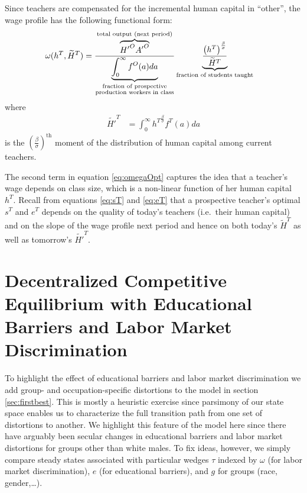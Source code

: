 \documentclass[onehalfspacing,11pt]{article}
\begin{document}
Since teachers are compensated for the incremental human capital in ``other'', the wage profile has the following functional form:
\begin{align}
\label{eq:omegaOpt}
   \omega(h^T,\widetilde{H}^T) & =  \frac{\overbrace{{H'}^O {A'}^O}^{\textrm{total output (next period)}}}{\underbrace{\int_0^\infty f^O(a) da}_{\begin{subarray}{c}\textrm{fraction of prospective} \\ \textrm{production workers in class}\end{subarray}}} \underbrace{\frac{\left( h^T \right)^{\frac{\beta}{\sigma}}}{{\widetilde{H}^T}}}_{\textrm{fraction of students taught}}
\end{align}
where
\begin{align*}
\label{}
  \widetilde{H'}^{T} & = \int_0^\infty {h^T}^{\frac{\beta}{\sigma}} f^T(a) da
\end{align*}
is the ${\left( \tfrac{\beta}{\sigma} \right)}^{\textrm{th}}$ moment of the distribution of human capital among current teachers.

The second term in equation \eqref{eq:omegaOpt} captures the idea that a teacher's wage depends on class size, which is a non-linear function of her human capital $h^T$. Recall from equations \eqref{eq:sT} and \eqref{eq:eT} that a prospective teacher's optimal $s^T$ and $e^T$ depends on the quality of today's teachers (i.e.~their human capital) and on the slope of the wage profile next period and hence on both today's $ \widetilde{H}^{T}$ as well as tomorrow's $\widetilde{H'}^{T}$.

\section{Decentralized Competitive Equilibrium with Educational Barriers and Labor Market Discrimination}
To highlight the effect of educational barriers and labor market discrimination we add group- and occupation-specific distortions to the model in section \ref{sec:firstbest}. This is mostly a heuristic exercise since parsimony of our state space enables us to characterize the full transition path from one set of distortions to another. We highlight this feature of the model here since there have arguably been secular changes in educational barriers and labor market distortions for groups other than white males. To fix ideas, however, we simply compare steady states associated with particular wedges $\tau$ indexed by $\omega$ (for labor market discrimination), $e$ (for educational barriers), and $g$ for groups (race, gender,\ldots).
\end{document}

